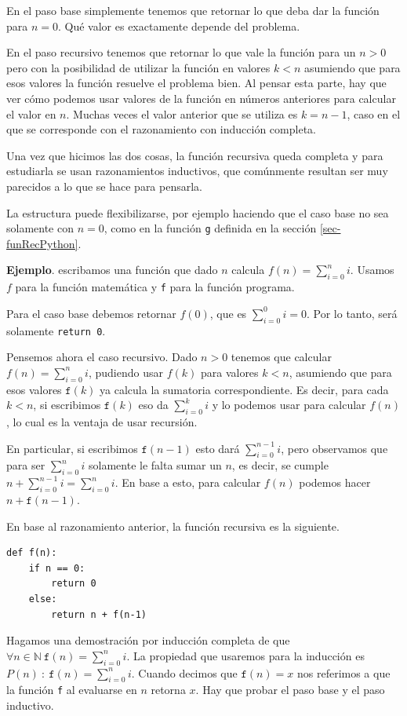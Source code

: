 \documentclass[a4paper, 12pt]{report}
\newcommand{\N}{\mathbb{N}}
\theoremstyle{definition}
\begin{document}
En el paso base simplemente tenemos que retornar lo que deba dar la función para $n=0$. Qué valor es exactamente depende del problema.

En el paso recursivo tenemos que retornar lo que vale la función para un $n>0$ pero con la posibilidad de utilizar la función en valores $k<n$ asumiendo que para esos valores la función resuelve el problema bien. Al pensar esta parte, hay que ver cómo podemos usar valores de la función en números anteriores para calcular el valor en $n$. Muchas veces el valor anterior que se utiliza es $k=n-1$, caso en el que se corresponde con el razonamiento con inducción completa.

Una vez que hicimos las dos cosas, la función recursiva queda completa y para estudiarla se usan razonamientos inductivos, que comúnmente resultan ser muy parecidos a lo que se hace para pensarla.

La estructura puede flexibilizarse, por ejemplo haciendo que el caso base no sea solamente con $n=0$, como en la función {\tt g} definida en la sección \ref{sec-funRecPython}.

\vspace{0.5em}
{\bf Ejemplo}. escribamos una función que dado $n$ calcula $f(n)=\sum_{i=0}^ni$. Usamos $f$ para la función matemática y {\tt f} para la función programa.

Para el caso base debemos retornar $f(0)$, que es $\sum_{i=0}^0i=0$. Por lo tanto, será solamente {\tt return 0}.

Pensemos ahora el caso recursivo. Dado $n>0$ tenemos que calcular $f(n)=\sum_{i=0}^ni$, pudiendo usar $f(k)$ para valores $k<n$, asumiendo que para esos valores $\mathtt{f}(k)$ ya calcula la sumatoria correspondiente. Es decir, para cada $k<n$, si escribimos $\mathtt{f}(k)$ eso da $\sum_{i=0}^ki$ y lo podemos usar para calcular $f(n)$, lo cual es la ventaja de usar recursión.

En particular, si escribimos $\mathtt{f}(n-1)$ esto dará $\sum_{i=0}^{n-1}i$, pero observamos que para ser $\sum_{i=0}^{n}i$ solamente le falta sumar un $n$, es decir,  se cumple $n+\sum_{i=0}^{n-1}i=\sum_{i=0}^{n}i$. En base a esto, para calcular $f(n)$ podemos hacer $n + \mathtt{f}(n-1)$.

En base al razonamiento anterior, la función recursiva es la siguiente.
\begin{verbatim}
def f(n):
    if n == 0:
        return 0
    else:
        return n + f(n-1)
\end{verbatim}
Hagamos una demostración por inducción completa de que $\forall n\in\N ~\mathtt{f}(n)=\sum_{i=0}^ni$. La propiedad que usaremos para la inducción es $P(n)~:~\mathtt{f}(n)=\sum_{i=0}^ni$. Cuando decimos que $\mathtt{f}(n)=x$ nos referimos a que la función {\tt f} al evaluarse en $n$ retorna $x$. Hay que probar el paso base y el paso inductivo.
\end{document}
